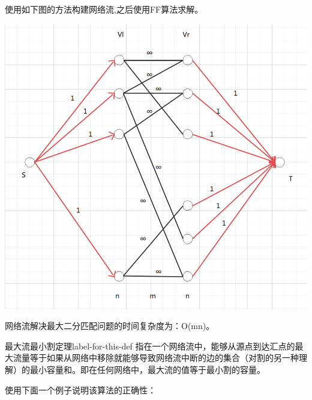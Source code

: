 使用如下图的方法构建网络流,之后使用FF算法求解。

\centerline{\includegraphics[scale=0.4]{Ln11.image/networkflow2.png}}

网络流解决最大二分匹配问题的时间复杂度为：O(mn)。

\begin{lemma}{最大流最小割定理}{label-for-this-def}
    指在一个网络流中，能够从源点到达汇点的最大流量等于如果从网络中移除就能够导致网络流中断的边的集合（对割的另一种理解）的最小容量和。即在任何网络中，最大流的值等于最小割的容量。
\end{lemma}

使用下面一个例子说明该算法的正确性：

